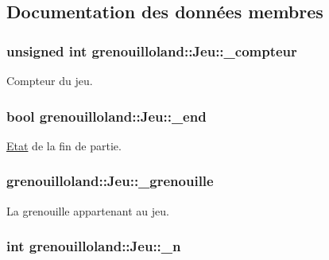 \subsection{Documentation des données membres}
\hypertarget{classgrenouilloland_1_1Jeu_acffeba39357d08306c91064a766b6e7d}{
\subsubsection[{\-\_\-compteur}]{\setlength{\rightskip}{0pt plus 5cm}unsigned int grenouilloland\-::\-Jeu\-::\-\_\-compteur\hspace{0.3cm}{\ttfamily [protected]}}}\label{classgrenouilloland_1_1Jeu_acffeba39357d08306c91064a766b6e7d}
Compteur du jeu. \hypertarget{classgrenouilloland_1_1Jeu_a2b1ca540559752ed171103258be5a58e}{
\subsubsection[{\-\_\-end}]{\setlength{\rightskip}{0pt plus 5cm}bool grenouilloland\-::\-Jeu\-::\-\_\-end\hspace{0.3cm}{\ttfamily [protected]}}}\label{classgrenouilloland_1_1Jeu_a2b1ca540559752ed171103258be5a58e}
\hyperlink{classgrenouilloland_1_1Etat}{Etat} de la fin de partie. \hypertarget{classgrenouilloland_1_1Jeu_a411e399b5c5e63bc2c8890dbd0f0a21a}{
\subsubsection[{\-\_\-grenouille}]{ grenouilloland\-::\-Jeu\-::\-\_\-grenouille\hspace{0.3cm}{\ttfamily [protected]}}}\label{classgrenouilloland_1_1Jeu_a411e399b5c5e63bc2c8890dbd0f0a21a}
La grenouille appartenant au jeu. \hypertarget{classgrenouilloland_1_1Jeu_ab30a76105853c15cc67ef86d20dec98f}{
\subsubsection[{\-\_\-n}]{\setlength{\rightskip}{0pt plus 5cm}int grenouilloland\-::\-Jeu\-::\-\_\-n\hspace{0.3cm}{\ttfamily [protected]}}}\label{classgrenouilloland_1_1Jeu_ab30a76105853c15cc67ef86d20dec98f}
